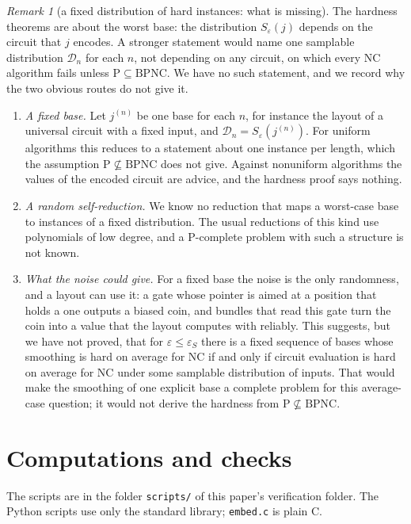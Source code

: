 \documentclass[11pt]{amsart}
\theoremstyle{definition}
\theoremstyle{remark}
\newtheorem{remark}[theorem]{Remark}
\newcommand{\eps}{\varepsilon}
\begin{document}
\begin{remark}[a fixed distribution of hard instances: what is missing]\label{rem:fixeddist}
The hardness theorems are about the worst base: the distribution $S_\eps(j)$ depends on the
circuit that $j$ encodes. A stronger statement would name one samplable distribution $\mathcal D_n$
for each $n$, not depending on any circuit, on which every NC algorithm fails unless
$\mathrm P\subseteq\mathrm{BPNC}$. We have no such statement, and we record why the two obvious
routes do not give it.
\begin{enumerate}[label=(\roman*),leftmargin=2.4em]
\item \emph{A fixed base.} Let $j^{(n)}$ be one base for each $n$, for instance the layout of a
universal circuit with a fixed input, and $\mathcal D_n=S_\eps(j^{(n)})$. For uniform algorithms
this reduces to a statement about one instance per length, which the assumption
$\mathrm P\not\subseteq\mathrm{BPNC}$ does not give. Against nonuniform algorithms the values
of the encoded circuit are advice, and the hardness proof says nothing.
\item \emph{A random self-reduction.} We know no reduction that maps a worst-case base to
instances of a fixed distribution. The usual reductions of this kind use polynomials of low
degree, and a P-complete problem with such a structure is not known.
\item \emph{What the noise could give.} For a fixed base the noise is the only randomness, and a
layout can use it: a gate whose pointer is aimed at a position that holds a one outputs a biased
coin, and bundles that read this gate turn the coin into a value that the layout computes with
reliably. This suggests, but we have not proved, that for $\eps\le\eps_S$ there is a fixed
sequence of bases whose smoothing is hard on average for NC if and only if circuit evaluation is
hard on average for NC under some samplable distribution of inputs. That would make the
smoothing of one explicit base a complete problem for this average-case question; it would not
derive the hardness from $\mathrm P\not\subseteq\mathrm{BPNC}$.
\end{enumerate}
\end{remark}

\section{Computations and checks}\label{sec:checks}

The scripts are in the folder \texttt{scripts/} of this paper's verification folder. The Python scripts use only
the standard library; \texttt{embed.c} is plain C.
\end{document}
